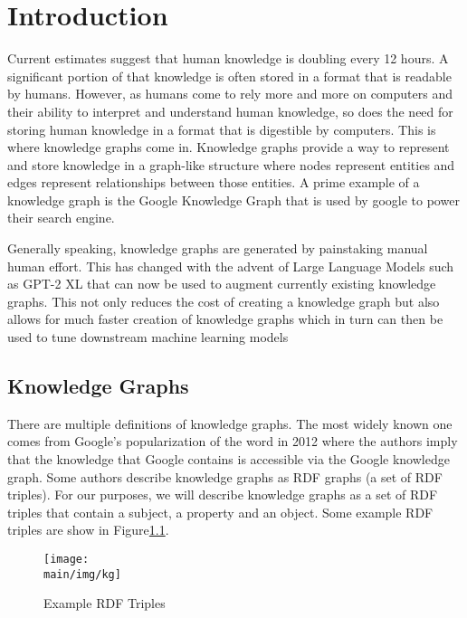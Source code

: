 \documentclass[\main/thesis.tex]{subfiles}
\begin{document}
\chapter{Introduction}

Current estimates suggest that human knowledge is doubling every 12 hours. A significant portion
of that knowledge is often stored in a format that is readable by humans. However, as humans come 
to rely more and more on computers and their ability to interpret and understand human knowledge, so
does the need for storing human knowledge in a format that is digestible by computers. This is where 
knowledge graphs come in. Knowledge graphs provide a way to represent and store knowledge in a 
graph-like structure where nodes represent entities and edges represent relationships between
those entities. A prime example of a knowledge graph is the Google Knowledge Graph that is used 
by google to power their search engine. 


Generally speaking, knowledge graphs are generated by painstaking manual human effort. 
This has changed with the advent of Large Language Models such as GPT-2 XL that can now be used to
augment currently existing knowledge graphs\cite{west_symbolic_2021}. This not only 
reduces the cost of creating a knowledge graph but also allows for much faster creation 
of knowledge graphs which in turn can then be used to tune downstream machine learning models\cite{noauthor_kelm_2021}


\section{Knowledge Graphs}\label{sec:knowledgeGraphs}

There are multiple definitions of knowledge graphs. The most widely known one comes from Google's 
popularization of the word in 2012\cite{noauthor_introducing_2012} where the authors imply 
that the knowledge that Google contains is accessible via the Google knowledge graph. Some 
authors describe knowledge graphs as RDF graphs (a set of RDF triples)\cite{farber_linked_2017}. 
For our purposes, we will describe knowledge graphs as a set of RDF triples that contain 
a subject, a property and an object. Some example RDF triples are show in Figure\ref{fig:kg_fig}.

\begin{figure}
    \centering
    \texttt{[image: \\main/img/kg]}
    \caption[Example RDF Triples] {Example RDF Triples}
    \label{fig:kg_fig}
\end{figure}
\end{document}

